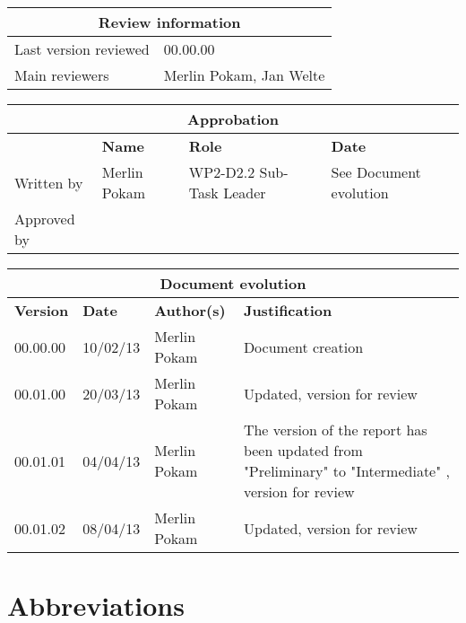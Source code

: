 \documentclass{template/openetcs_report}
\begin{document}
\begin{tabular}{|p{4.4cm}|p{8.7cm}|}
\hline
\multicolumn{2}{|c|}{\textbf{Review information}} \\
\hline
Last version reviewed & 00.00.00 \\
\hline
Main reviewers & Merlin Pokam, Jan Welte \\
\hline
\end{tabular}

\begin{tabular}{|p{2.2cm}|p{4cm}|p{4cm}|p{2cm}|}
\hline
\multicolumn{4}{|c|}{\textbf{Approbation}} \\
\hline
  &  \textbf{Name} & \textbf{Role} & \textbf{Date}   \\
\hline  
Written by    &  Merlin Pokam & WP2-D2.2 Sub-Task Leader  & See Document evolution\\
\hline
Approved by &  &  & \\
\hline
\end{tabular}

\begin{tabular}{|p{2.2cm}|p{2cm}|p{3cm}|p{5cm}|}
\hline
\multicolumn{4}{|c|}{\textbf{Document evolution}} \\
\hline
\textbf{Version} &  \textbf{Date} & \textbf{Author(s)} & \textbf{Justification}  \\
\hline  
00.00.00 & 10/02/13 & Merlin Pokam &  Document creation  \\
\hline  
00.01.00 & 20/03/13 & Merlin Pokam &  Updated, version for review  \\
\hline
00.01.01 & 04/04/13 & Merlin Pokam &  The version of the report has been updated from "Preliminary" to "Intermediate" , version for review  \\
\hline
00.01.02 & 08/04/13 & Merlin Pokam &  Updated, version for review  \\
\hline
\end{tabular}



\tableofcontents
\listoffiguresandtables




\chapter{Abbreviations}
\end{document}

